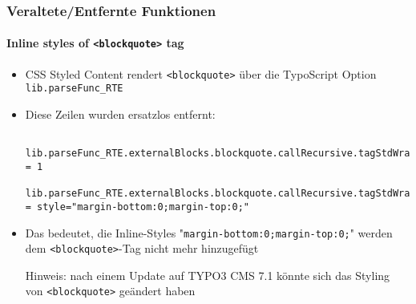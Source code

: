
\begin{frame}[fragile]
	\frametitle{Veraltete/Entfernte Funktionen}
	\framesubtitle{Inline styles of \texttt{<blockquote>} tag}

	\lstset{basicstyle=\tiny\ttfamily}

	\begin{itemize}

		\item CSS Styled Content rendert \texttt{<blockquote>} über die TypoScript Option \texttt{lib.parseFunc\_RTE}
		\item Diese Zeilen wurden ersatzlos entfernt:

			\begin{lstlisting}
				lib.parseFunc_RTE.externalBlocks.blockquote.callRecursive.tagStdWrap.HTMLparser = 1
				lib.parseFunc_RTE.externalBlocks.blockquote.callRecursive.tagStdWrap.HTMLparser.tags.blockquote.overrideAttribs = style="margin-bottom:0;margin-top:0;"
			\end{lstlisting}

		\item Das bedeutet, die Inline-Styles "\texttt{margin-bottom:0;margin-top:0;}"\newline
			werden dem \texttt{<blockquote>}-Tag nicht mehr hinzugefügt

			\vspace{0.2cm}

			\begingroup
				\color{red}
					Hinweis: nach einem Update auf TYPO3 CMS 7.1 könnte sich das
					Styling von \texttt{<blockquote>} geändert haben
			\endgroup

	\end{itemize}

\end{frame}


